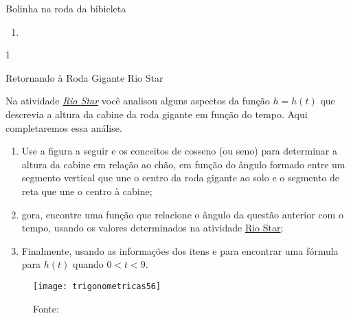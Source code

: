 \begin{answer}{Bolinha na roda da bibicleta}
{\begin{enumerate}[left=0pt, wide]
\item \phantom{a}


\end{enumerate}
}{1}
\end{answer}
\label{trig-exp4}

\begin{task}{Retornando à Roda Gigante Rio Star}
\label{trig-ativ15}

Na atividade \hyperref[trig-ativ4]{\textit{Rio Star}}  você analisou alguns aspectos da função $h = h(t)$ que descrevia a altura da cabine da roda gigante em função do tempo. Aqui completaremos essa análise.
\begin{enumerate}
\item Use a figura a seguir e os conceitos de cosseno (ou seno) para determinar a altura da cabine em relação ao chão, em função do ângulo formado entre um segmento vertical que une o centro da roda gigante ao solo e o segmento de reta que une o centro à cabine;
\item gora, encontre uma função que relacione o ângulo da questão anterior com o tempo, usando os valores determinados na atividade \hyperref[trig-ativ4]{Rio Star};
\item Finalmente, usando as informações dos itens  e  para encontrar uma fórmula para $h(t)$ quando $0 < t < 9$.
\end{enumerate}

\begin{figure}[H]
\centering

\texttt{[image: trigonometricas56]}
\caption{Fonte: \cite{soares2010}}

\end{figure}
\end{task}

